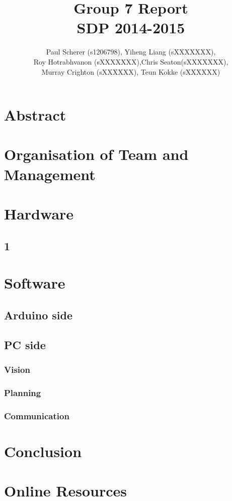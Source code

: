 \documentclass[12pt,a4paper]{article}
\begin{document}
\title{Group 7 Report\\
		SDP 2014-2015}
\author{Paul Scherer (s1206798), Yiheng Liang (sXXXXXXX),\\ Roy Hotrabhvanon (sXXXXXXX),Chris Seaton(sXXXXXXX),\\ Murray Crighton (sXXXXXX), Teun Kokke (sXXXXXX)}
\maketitle

\section{Abstract}

\section{Organisation of Team and Management}

\section{Hardware}
\subsection{1}


\section{Software}
\subsection{Arduino side}

\subsection{PC side}
\subsubsection{Vision}
\subsubsection{Planning}
\subsubsection{Communication}

\section{Conclusion}

\section{Online Resources}
\end{document}
